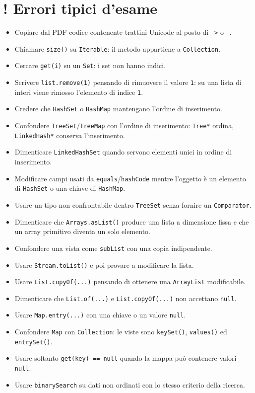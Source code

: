 ﻿\documentclass[10pt,a4paper]{article}
\newcommand{\cmd}[1]{\texttt{#1}}
\DeclareRobustCommand{\exammark}{%
  \texorpdfstring{\textcolor{examred}{\bfseries\Large !}\hspace{.18em}}{! }%
}
\newcommand{\topicsection}[1]{\Needspace{12\baselineskip}\section{#1}}
\newenvironment{topicblock}{%
  \par\medskip\noindent\begin{minipage}{\textwidth}%
}{%
  \end{minipage}\par\medskip%
}
\begin{document}
\begin{topicblock}
\topicsection{\exammark Errori tipici d'esame}

\begin{itemize}
\item Copiare dal PDF codice contenente trattini Unicode al posto di \cmd{->} o \cmd{-}.
\item Chiamare \cmd{size()} su \cmd{Iterable}: il metodo appartiene a \cmd{Collection}.
\item Cercare \cmd{get(i)} su un \cmd{Set}: i set non hanno indici.
\item Scrivere \cmd{list.remove(1)} pensando di rimuovere il valore \cmd{1}: su una lista di interi viene rimosso l'elemento di indice \cmd{1}.
\item Credere che \cmd{HashSet} o \cmd{HashMap} mantengano l'ordine di inserimento.
\item Confondere \cmd{TreeSet}/\cmd{TreeMap} con l'ordine di inserimento: \cmd{Tree*} ordina, \cmd{LinkedHash*} conserva l'inserimento.
\item Dimenticare \cmd{LinkedHashSet} quando servono elementi unici in ordine di inserimento.
\item Modificare campi usati da \cmd{equals}/\cmd{hashCode} mentre l'oggetto è un elemento di \cmd{HashSet} o una chiave di \cmd{HashMap}.
\item Usare un tipo non confrontabile dentro \cmd{TreeSet} senza fornire un \cmd{Comparator}.
\item Dimenticare che \cmd{Arrays.asList()} produce una lista a dimensione fissa e che un array primitivo diventa un solo elemento.
\item Confondere una vista come \cmd{subList} con una copia indipendente.
\item Usare \cmd{Stream.toList()} e poi provare a modificare la lista.
\item Usare \cmd{List.copyOf(...)} pensando di ottenere una \cmd{ArrayList} modificabile.
\item Dimenticare che \cmd{List.of(...)} e \cmd{List.copyOf(...)} non accettano \cmd{null}.
\item Usare \cmd{Map.entry(...)} con una chiave o un valore \cmd{null}.
\item Confondere \cmd{Map} con \cmd{Collection}: le viste sono \cmd{keySet()}, \cmd{values()} ed \cmd{entrySet()}.
\item Usare soltanto \cmd{get(key) == null} quando la mappa può contenere valori \cmd{null}.
\item Usare \cmd{binarySearch} su dati non ordinati con lo stesso criterio della ricerca.

\end{itemize}
\end{topicblock}
\end{document}
